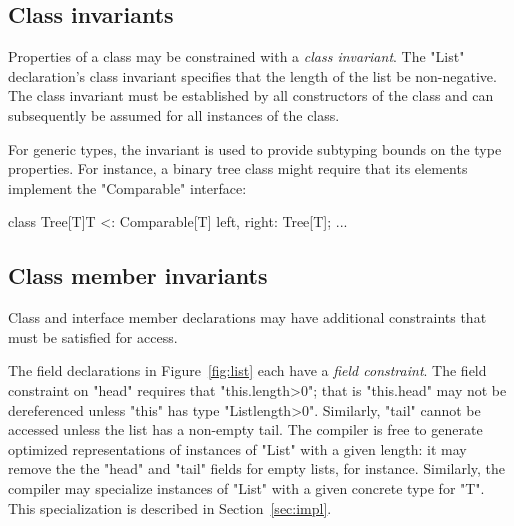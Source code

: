\subsection{Class invariants}

Properties of a class may be constrained with 
a \emph{class invariant}.   
The \xcd"List" declaration's class invariant specifies that the length of
the list be non-negative.  
The class invariant must be established by all constructors of
the class and can subsequently be assumed for all instances of the class.

For generic types, the invariant is used to provide subtyping
bounds on the type properties.  For instance, a binary
tree class
might require that its elements implement the \xcd"Comparable"
interface:
\clearpage
{\footnotesize
\begin{xten}
class Tree[T]{T <: Comparable[T]} {
  left, right: Tree[T]; ...
}
\end{xten}}

\subsection{Class member invariants}

Class and interface member declarations may have additional
constraints that must be satisfied for access.

The field  declarations in Figure~\ref{fig:list}
each have a \emph{field constraint}.  The field constraint on
\xcd"head" requires that \xcd"this.length>0";
that is \xcd"this.head" may not be dereferenced
unless \xcd"this" has type \xcd"List{length>0}".  Similarly,
\xcd"tail" cannot be accessed unless the list has a non-empty tail.  The
compiler is free to generate optimized representations of
instances of \xcd"List" with a given length: it may remove the
the \xcd"head" and \xcd"tail" fields for empty lists, for
instance.  Similarly, the compiler may specialize instances of
\xcd"List" with a given concrete type for \xcd"T".  This
specialization is described in Section~\ref{sec:impl}.


